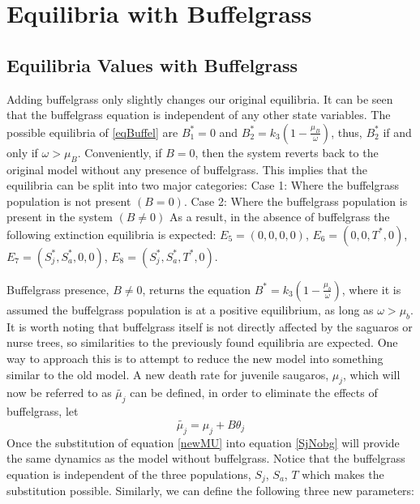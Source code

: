 \documentclass[a4paper]{article}
\begin{document}


\section{Equilibria with Buffelgrass}

\subsection{Equilibria Values with Buffelgrass}
Adding buffelgrass only slightly changes our original equilibria. It can be seen that the  buffelgrass equation is independent of any other state variables. The possible equilibria of \ref{eqBuffel} are $B^*_1 = 0$ and $B^*_2 = k_3 \left(1 - \displaystyle\frac{\mu_B}{\omega}\right)$, thus, $B_2^*$ if and only if $\omega > \mu_B$. Conveniently, if $B = 0$, then the system reverts back to the original model without any presence of buffelgrass. This implies that the equilibria can be split into two major categories: Case 1: Where the buffelgrass population is not present $(B=0)$. Case 2: Where the buffelgrass population is present in the system $(B \neq 0)$
\newline \newline As a result, in the absence of buffelgrass the following extinction equilibria is expected: $E_5 = (0,0,0,0)$, $E_6 = (0,0,T^*, 0)$, $E_7 = (S_j^*, S_a^*, 0, 0)$, $E_8 = (S_j^*, S_a^*, T^*, 0)$. \newline

Buffelgrass presence, $B \neq 0$, returns the equation $B^* = k_3\left(1 - \displaystyle\frac{\mu_b}{\omega} \right)$, where it is assumed the buffelgrass population is at a positive equilibrium, as long as $\omega > \mu_b$. It is worth noting that buffelgrass itself is not directly affected by the saguaros or nurse trees, so similarities to the previously found equilibria are expected. One way to approach this is to attempt to reduce the new model into something similar to the old model. A new death rate for juvenile saugaros, $\mu_j$, which will now be referred to as $\tilde{\mu_j}$ can be defined, in order to eliminate the effects of buffelgrass, let 
\begin{equation}\label{newMU}
\tilde{\mu_{j}} = \mu_j + B \theta_j
\end{equation}
Once the substitution of equation \ref{newMU} into equation \ref{SjNobg} will provide the same dynamics as the model without buffelgrass. Notice that the buffelgrass equation is independent of the three populations, $S_j$, $S_a$, $T$ which makes the substitution possible.
Similarly, we can define the following three new parameters:
\end{document}
